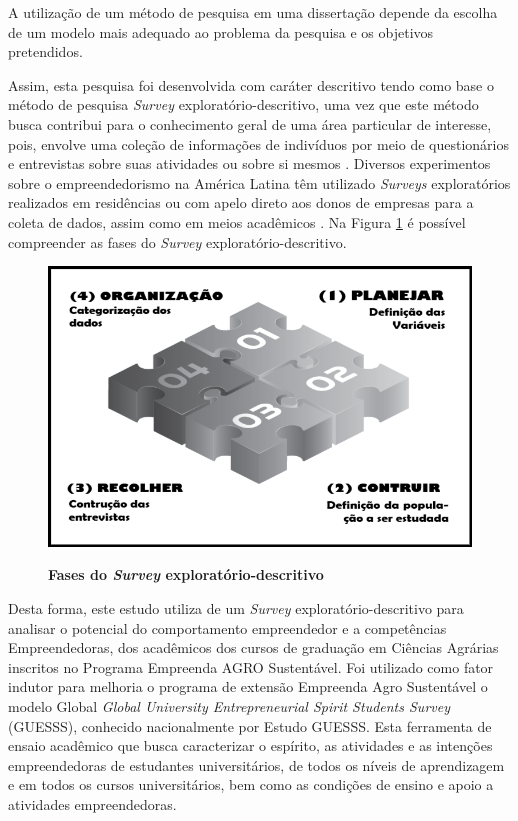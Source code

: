 A utilização de um método de pesquisa em uma dissertação depende da escolha de um modelo mais adequado ao problema da pesquisa e os objetivos pretendidos.

Assim, esta pesquisa foi desenvolvida com caráter descritivo tendo como base o método de pesquisa \textit{Survey} exploratório-descritivo, uma vez que este método busca contribui para o conhecimento geral de uma área particular de interesse, pois, envolve uma coleção de informações de indivíduos por meio de questionários e entrevistas sobre suas atividades ou sobre si mesmos \cite{forza_survey_2002}. Diversos experimentos sobre o empreendedorismo na América Latina têm utilizado \textit{Surveys} exploratórios realizados em residências ou com apelo direto aos donos de empresas para a coleta de dados, assim como em meios acadêmicos \cite{lima_ser_2015}. Na Figura \ref{figura_8} é possível compreender as fases do \textit{Survey} exploratório-descritivo.

\begin{figure}[H]
\centering
\caption{\textbf{Fases do \textit{Survey} exploratório-descritivo}}
\includegraphics[scale=0.5]{Imagens/survey.png}
\label{figura_8}
\end{figure}

Desta forma, este estudo utiliza de um \textit{Survey} exploratório-descritivo para analisar o potencial do comportamento empreendedor e a competências Empreendedoras, dos acadêmicos dos cursos de graduação em Ciências Agrárias inscritos no Programa Empreenda AGRO Sustentável. Foi utilizado como fator indutor para melhoria o programa de extensão Empreenda Agro Sustentável o modelo Global \textit{Global University Entrepreneurial Spirit Students Survey} (GUESSS), conhecido nacionalmente por Estudo GUESSS. Esta ferramenta de ensaio acadêmico que busca caracterizar o espírito, as atividades e as intenções empreendedoras de estudantes universitários, de todos os níveis de aprendizagem e em todos os cursos universitários, bem como as condições de ensino e apoio a atividades empreendedoras. 

